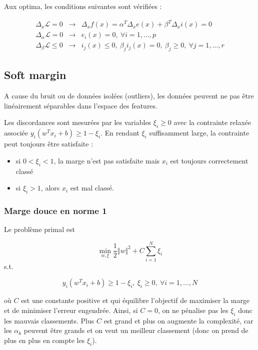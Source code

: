 	Aux optima, les conditions suivantes sont vérifiées :
	
	\begin{eqnarray*}
	\Delta_x \mathcal{L} = 0 & \rightarrow & \Delta_x f(x) = \alpha^T \Delta_x e(x) + \beta^T \Delta_x i(x) = 0 \\
	\Delta_{\alpha} \mathcal{L} = 0 & \rightarrow & e_i(x) = 0, \: \forall i = 1, \dots , p \\
	\Delta_\beta \mathcal{L} \leq 0 & \rightarrow & i_j(x) \leq 0, \: \beta_j i_j(x) = 0, \: \beta_j \geq 0, \: \forall j = 1, \dots , r
	\end{eqnarray*}
		
	\subsection{Soft margin}
	
	A cause du bruit ou de données isolées (outliers), les données peuvent ne pas être linéairement séparables dans l'espace des features. 
	
	
	Les discordances sont mesurées par les variables $\xi_i \geq 0$ avec la contrainte relaxée associée $y_i(w^Tx_i + b) \geq 1 - \xi_i$. En rendant $\xi_i$ suffisamment large, la contrainte peut toujours être satisfaite :
	
	\begin{itemize}
		\item si $0 < \xi_i < 1$, la marge n'est pas satisfaite mais $x_i$ est toujours correctement classé
		\item si $\xi_i > 1$, alors $x_i$ est mal classé.
	\end{itemize}
	
	\subsubsection{Marge douce en norme 1}
	
	Le problème primal est
	
	$$\min_{w, \xi} \frac{1}{2} \Vert w \Vert^2 + C \sum_{i = 1}^N \xi_i$$
	s.t.
	
	$$y_i(w^T x_i + b) \geq 1 - \xi_i, \: \xi_i \geq 0, \: \forall i = 1, \dots , N$$
	
	où $C$ est une constante positive et qui équilibre l'objectif de maximiser la marge et de minimiser l'erreur engendrée. Ainsi, si $C = 0$, on ne pénalise pas les $\xi_i$ donc les mauvais classements. Plus $C$ est grand et plus on augmente la complexité, car les $\alpha_k$ peuvent être grands et on veut un meilleur classement (donc on prend de plus en plus en compte les $\xi_i$).
	
